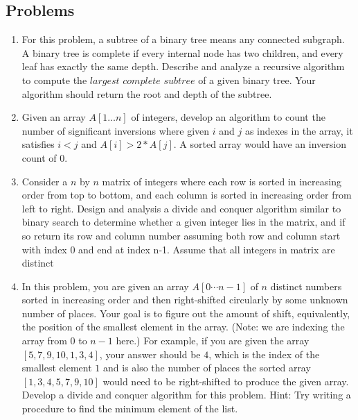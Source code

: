 \documentclass{article}
\begin{document}

\noindent
{}

\subsection*{Problems}

\begin{enumerate}
\item
	For this problem, a subtree of a binary tree means any connected subgraph. A binary tree is complete if every internal node has two children, and every leaf has exactly the same depth. Describe and analyze a recursive algorithm to compute the $largest$ $complete$ $subtree$ of a given binary tree. Your algorithm should return the root and depth of the subtree.

\item
    Given an array $A[1\ldots n]$ of integers, develop an algorithm to count the number of significant inversions where given $i$ and $j$ as indexes in the array, it satisfies $i<j$ and $A[i]>2*A[j]$. A sorted array would have an inversion count of 0.
    
\item  
    Consider a $n$ by $n$ matrix of integers where each row is sorted in increasing order from top to bottom, and each column is sorted in increasing order from left to right. Design and analysis a divide and conquer algorithm similar to binary search to determine whether a given integer lies in the matrix, and if so return its row and column number assuming both row and column start with index 0 and end at index n-1. Assume that all integers in matrix are distinct

\item 
    In this problem, you are given an array $A[0\cdots n-1]$ of $n$
distinct numbers sorted in increasing order and then right-shifted
circularly by some unknown number of places. Your goal is to figure
out the amount of shift, equivalently, the position of the smallest
element in the array. (Note: we are indexing the array from $0$ to
$n-1$ here.) For example, if you are given the array
$[5,7,9,10,1,3,4]$, your answer should be $4$, which is the index of the
smallest element $1$ and is also the number of places the sorted array
$[1,3,4,5,7,9,10]$ would need to be right-shifted to produce the given array.
Develop a divide and conquer algorithm for this problem.
Hint: Try writing a procedure to find the minimum element of the list.


\end{enumerate}
\end{document}
